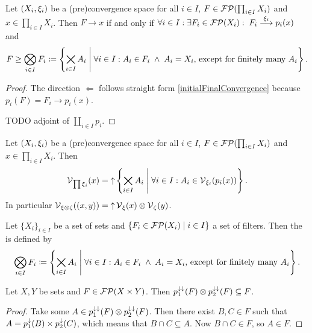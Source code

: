 \begin{proposition} \label{convergenceProductFilter}
Let $\left( X_i, \xi_i \right)$ be a (pre)convergence space for all $i\in I$, $F \in \operatorname{\mathcal{FP}}(\prod_{i\in I}X_i)$ and $x\in \prod_{i\in I}X_i$. Then $F\to x$ \textup{if and only if} $\forall i\in I: \exists F_i\in \operatorname{\mathcal{FP}}(X_i): 
\; F_i \overset{\xi_i}{\longrightarrow} p_i(x)$ and
\[ F \geq \bigotimes_{i\in I}F_i \coloneqq \left\{ \bigtimes_{i\in I}A_i \;\middle|\; \forall i\in I: A_i \in F_i \;\land\; A_i = X_i, \,\text{except for finitely many $A_i$} \right\}. \]
\end{proposition}
\begin{proof}
The direction $\Leftarrow$ follows straight form \ref{initialFinalConvergence} because $p_i(F) = F_i \to p_i(x)$.

TODO adjoint of $\coprod_{i\in I}p_i$.
\end{proof}
\begin{corollary} \label{productVicinity}
Let $\left( X_i, \xi_i \right)$ be a (pre)convergence space for all $i\in I$, $F \in \operatorname{\mathcal{FP}}(\prod_{i\in I}X_i)$ and $x\in \prod_{i\in I}X_i$. Then
\[\operatorname{\mathcal{V}}_{\prod \xi_i}(x) = \operatorname{\uparrow} \left\{ \bigtimes_{i\in I}A_i \;\middle|\; \forall i\in I: A_i \in \operatorname{\mathcal{V}}_{\xi_i}(p_i(x)) \right\}. \]
In particular $\operatorname{\mathcal{V}}_{\xi\otimes \zeta}((x,y)) = \operatorname{\uparrow} \operatorname{\mathcal{V}}_\xi(x)\otimes \operatorname{\mathcal{V}}_\zeta(y)$.
\end{corollary}

\begin{definition}
Let $\{X_i\}_{i\in I}$ be a set of sets and $\left\{ F_i \in \operatorname{\mathcal{FP}}(X_i) \;\middle|\; i\in I \right\}$ a set of filters. Then the  is defined by
\[ \bigotimes_{i\in I}F_i \coloneqq \left\{ \bigtimes_{i\in I}A_i \;\middle|\; \forall i\in I: A_i \in F_i \;\land\; A_i = X_i, \,\text{except for finitely many $A_i$} \right\}.  \]
\end{definition}

\begin{lemma} \label{filterFactorisationInequality}
Let $X,Y$ be sets and $F \in \operatorname{\mathcal{FP}}(X\times Y)$. Then $p_1^{\downarrow\downarrow}(F)\otimes p_2^{\downarrow\downarrow}(F) \subseteq F$.
\end{lemma}
\begin{proof}
Take some $A\in p_1^{\downarrow\downarrow}(F)\otimes p_2^{\downarrow\downarrow}(F)$. Then there exist $B,C\in F$ such that $A = p_1^\downarrow(B)\times p_2^\downarrow(C)$, which means that $B\cap C\subseteq A$. Now $B\cap C \in F$, so $A\in F$.
\end{proof}

